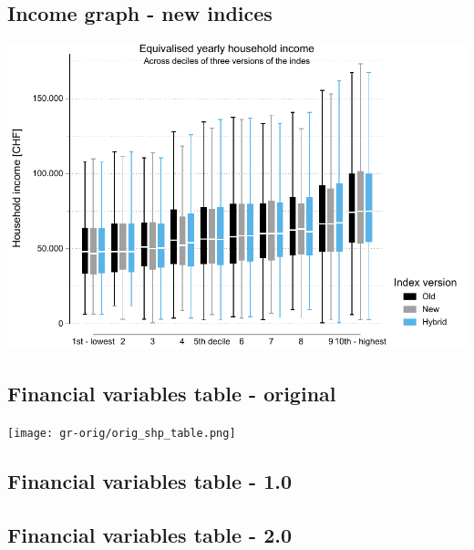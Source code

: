\documentclass[a4paper, notitlepage, fleqn]{article} %
\begin{document}
\subsection{Income graph - new indices}
\begin{center}
\includegraphics[width=.75\textwidth]{gr/shp_income.pdf} 
\end{center}

\newpage
\subsection{Financial variables table - original}

\begin{center}
\texttt{[image: gr-orig/orig\_shp\_table.png]} 
\end{center}

\newpage
\subsection{Financial variables table - 1.0}
\begin{stlog}\end{stlog}
\newpage
\begin{stlog}\end{stlog}
\newpage
\begin{stlog}\end{stlog}
\newpage
\subsection{Financial variables table - 2.0}
\begin{stlog}\end{stlog}
\newpage
\begin{stlog}\end{stlog}
\newpage
\begin{stlog}\end{stlog}
\newpage
\end{document}
